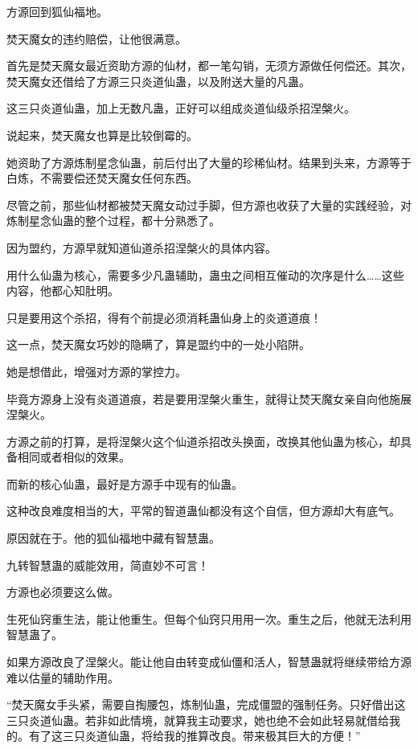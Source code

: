 
\begin{this_body}



方源回到狐仙福地。

焚天魔女的违约赔偿，让他很满意。

首先是焚天魔女最近资助方源的仙材，都一笔勾销，无须方源做任何偿还。其次，焚天魔女还借给了方源三只炎道仙蛊，以及附送大量的凡蛊。

这三只炎道仙蛊，加上无数凡蛊，正好可以组成炎道仙级杀招涅槃火。

说起来，焚天魔女也算是比较倒霉的。

她资助了方源炼制星念仙蛊，前后付出了大量的珍稀仙材。结果到头来，方源等于白炼，不需要偿还焚天魔女任何东西。

尽管之前，那些仙材都被焚天魔女动过手脚，但方源也收获了大量的实践经验，对炼制星念仙蛊的整个过程，都十分熟悉了。

因为盟约，方源早就知道仙道杀招涅槃火的具体内容。

用什么仙蛊为核心，需要多少凡蛊辅助，蛊虫之间相互催动的次序是什么……这些内容，他都心知肚明。

只是要用这个杀招，得有个前提必须消耗蛊仙身上的炎道道痕！

这一点，焚天魔女巧妙的隐瞒了，算是盟约中的一处小陷阱。

她是想借此，增强对方源的掌控力。

毕竟方源身上没有炎道道痕，若是要用涅槃火重生，就得让焚天魔女亲自向他施展涅槃火。

方源之前的打算，是将涅槃火这个仙道杀招改头换面，改换其他仙蛊为核心，却具备相同或者相似的效果。

而新的核心仙蛊，最好是方源手中现有的仙蛊。

这种改良难度相当的大，平常的智道蛊仙都没有这个自信，但方源却大有底气。

原因就在于。他的狐仙福地中藏有智慧蛊。

九转智慧蛊的威能效用，简直妙不可言！

方源也必须要这么做。

生死仙窍重生法，能让他重生。但每个仙窍只用用一次。重生之后，他就无法利用智慧蛊了。

如果方源改良了涅槃火。能让他自由转变成仙僵和活人，智慧蛊就将继续带给方源难以估量的辅助作用。

“焚天魔女手头紧，需要自掏腰包，炼制仙蛊，完成僵盟的强制任务。只好借出这三只炎道仙蛊。若非如此情境，就算我主动要求，她也绝不会如此轻易就借给我的。有了这三只炎道仙蛊，将给我的推算改良。带来极其巨大的方便！”


\end{this_body}
